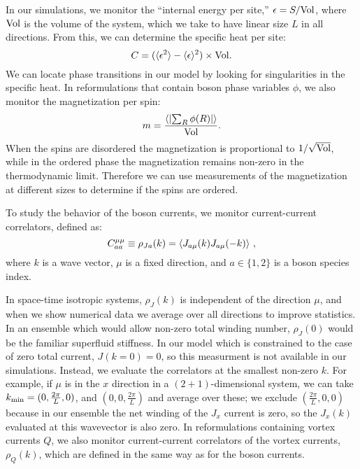 In our simulations, we monitor the ``internal energy per site,'' $\epsilon= S /{\rm Vol}$, where ${\rm Vol}$ is the volume of the system, which we take to have linear size $L$ in all directions. From this, we can determine the specific heat per site:
\begin{equation}
C=(\langle \epsilon^2\rangle-\langle\epsilon\rangle^2)\times{\rm Vol}.
\end{equation}
We can locate phase transitions in our model by looking for singularities in the specific heat. In reformulations that contain boson phase variables $\phi$, we also monitor the magnetization per spin:
\begin{equation}
m = \frac{\left\langle \left|\sum_R \phi(R) \right|\right\rangle}{\rm Vol}.
\end{equation}
When the spins are disordered the magnetization is proportional to $1/\sqrt{\rm Vol}$, while in the ordered phase the magnetization remains non-zero in the thermodynamic limit. Therefore we can use measurements of the magnetization at different sizes to determine if the spins are ordered.

To study the behavior of the boson currents, we monitor current-current correlators, defined as:
\begin{equation}
C^{\mu\mu}_{aa}\equiv\rho_{Ja}({k})=\langle J_{a\mu}({k})J_{a\mu}(-{k})\rangle ~,
\label{rho}
\end{equation}
where $k$ is a wave vector, $\mu$ is a fixed direction, and  $a\in\{1,2\}$ is a boson species index.

In space-time isotropic systems, $\rho_J({k})$ is independent of the direction $\mu$, and when we show numerical data we average over all directions to improve statistics. In an ensemble which would allow non-zero total winding number, $\rho_J(0)$ would be the familiar superfluid stiffness. In our model which is constrained to the case of zero total current, $J(k=0)=0$, so this measurment is not available in our simulations. Instead, we evaluate the correlators at the smallest non-zero ${k}$.  For example, if $\mu$ is in the $x$ direction in a $(2+1)$-dimensional system, we can take ${k}_{\rm min}=(0,\frac{2\pi}{L},0)$, and $(0,0,\frac{2\pi}{L})$ and average over these; we exclude $(\frac{2\pi}{L},0,0)$ because in our ensemble the net winding of the $J_x$ current is zero, so the $J_x(k)$ evaluated at this wavevector is also zero. In reformulations containing vortex currents $Q$, we also monitor current-current correlators of the vortex currents, $\rho_Q(k)$, which are defined in the same way as for the boson currents.

